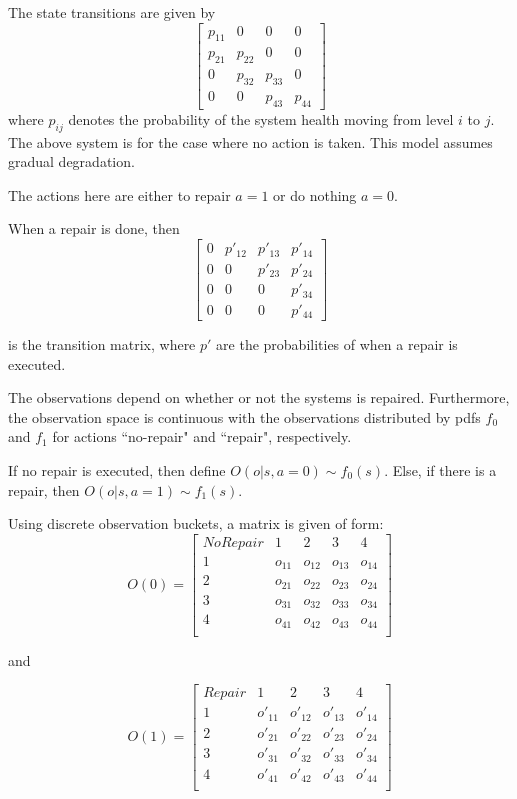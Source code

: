 \documentclass[english]{article}
\numberwithin{equation}{section}
\begin{document}
	The state transitions are given by 
	$$
	\begin{bmatrix}
	p_{11} & 0 & 0 & 0 \\
	p_{21} & p_{22} & 0 & 0 \\
	0 & p_{32} & p_{33} & 0 \\
	0 & 0 & p_{43} & p_{44}
	\end{bmatrix}
	$$
	where $p_{ij}$ denotes the probability of the system health moving from level $i$ to $j$. The above system is for the case where no action is taken. This model assumes gradual degradation.
	
	The actions here are either to repair $a=1$ or do nothing $a=0$.
	
	When a repair is done, then
	$$
	\begin{bmatrix}
	0 & p'_{12} & p'_{13} & p'_{14} \\
	0 & 0 & p'_{23} & p'_{24} \\
	0 & 0 & 0 & p'_{34} \\
	0 & 0 & 0 & p'_{44}
	\end{bmatrix}
	$$
	
	is the transition matrix, where $p'$ are the probabilities of when a repair is executed. 
	
	The observations depend on whether or not the systems is repaired. Furthermore, the observation space is continuous with the observations distributed by pdfs $f_0$ and $f_1$ for actions ``no-repair" and ``repair", respectively.
	
	If no repair is executed, then define $O(o|s,a=0) \sim f_0(s)$. Else, if there is a repair, then $O(o|s,a=1) \sim f_1(s)$.
	
	Using discrete observation buckets, a matrix is given of form:
	$$    O(0) = 
	\begin{bmatrix}
	No Repair & 1 & 2 & 3 & 4 \\
	1 & o_{11} & o_{12} & o_{13} & o_{14} \\
	2 & o_{21} & o_{22} & o_{23} & o_{24} \\
	3 & o_{31} & o_{32} & o_{33} & o_{34} \\
	4 & o_{41} & o_{42} & o_{43} & o_{44} \\
	\end{bmatrix}
	$$
	
	and
	
	$$    O(1) = 
	\begin{bmatrix}
	Repair & 1 & 2 & 3 & 4 \\
	1 & o'_{11} & o'_{12} & o'_{13} & o'_{14} \\
	2 & o'_{21} & o'_{22} & o'_{23} & o'_{24} \\
	3 & o'_{31} & o'_{32} & o'_{33} & o'_{34} \\
	4 & o'_{41} & o'_{42} & o'_{43} & o'_{44} \\
	\end{bmatrix}
	$$
	
\end{document}
